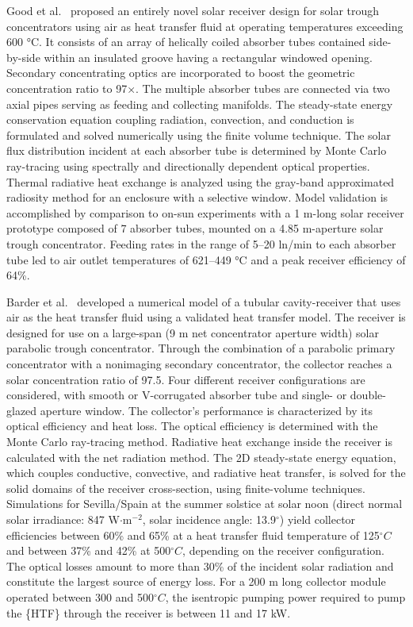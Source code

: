 Good et al.~\cite{Good2015} proposed an entirely novel solar receiver design for solar trough concentrators using air as heat transfer fluid at operating temperatures exceeding 600 °C. It consists of an array of helically coiled absorber tubes contained side-by-side within an insulated groove having a rectangular windowed opening. Secondary concentrating optics are incorporated to boost the geometric concentration ratio to 97×. The multiple absorber tubes are connected via two axial pipes serving as feeding and collecting manifolds. The steady-state energy conservation equation coupling radiation, convection, and conduction is formulated and solved numerically using the finite volume technique. The solar flux distribution incident at each absorber tube is determined by Monte Carlo ray-tracing using spectrally and directionally dependent optical properties. Thermal radiative heat exchange is analyzed using the gray-band approximated radiosity method for an enclosure with a selective window. Model validation is accomplished by comparison to on-sun experiments with a 1 m-long solar receiver prototype composed of 7 absorber tubes, mounted on a 4.85 m-aperture solar trough concentrator. Feeding rates in the range of 5–20 ln/min to each absorber tube led to air outlet temperatures of 621–449 °C and a peak receiver efficiency of 64\%.

Barder et al.~\cite{Bader2015} developed a numerical model of a tubular cavity-receiver that uses air as the heat transfer fluid using a validated heat transfer model. The receiver is designed for use on a large-span (9 m net concentrator aperture width) solar parabolic trough concentrator. Through the combination of a parabolic primary concentrator with a nonimaging secondary concentrator, the collector reaches a solar concentration ratio of 97.5. Four different receiver configurations are considered, with smooth or V-corrugated absorber tube and single- or double-glazed aperture window. The collector's performance is characterized by its optical efficiency and heat loss. The optical efficiency is determined with the Monte Carlo ray-tracing method. Radiative heat exchange inside the receiver is calculated with the net radiation method. The 2D steady-state energy equation, which couples conductive, convective, and radiative heat transfer, is solved for the solid domains of the receiver cross-section, using finite-volume techniques. Simulations for Sevilla/Spain at the summer solstice at solar noon (direct normal solar irradiance: 847 W$\cdot$m$^{-2}$, solar incidence angle: 13.9$^\circ$) yield collector efficiencies between 60\% and 65\% at a heat transfer fluid temperature of 125$^\circ{}C$ and between 37\% and 42\% at 500$^\circ{}C$, depending on the receiver configuration. The optical losses amount to more than 30\% of the incident solar radiation and constitute the largest source of energy loss. For a 200 m long collector module operated between 300 and 500$^\circ{}C$, the isentropic pumping power required to pump the \{HTF\} through the receiver is between 11 and 17 kW. 

